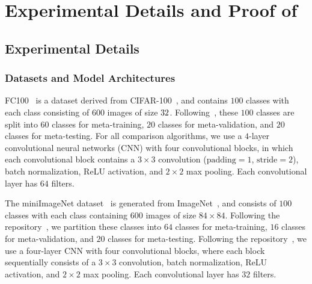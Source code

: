 \documentclass{osudissert96}
\begin{document}
\appendix

\chapter{Experimental Details and Proof of }\label{sec: append_deter_bilevel}

\section{Experimental Details}\label{appen:meta_learning}
\subsection*{Datasets and Model Architectures}
FC100~\cite{oreshkin2018tadam} is a dataset derived from CIFAR-100~\cite{krizhevsky2009learning}, and contains $100$ classes with each class consisting of $600$ images of size $32\time 32$. Following~\cite{oreshkin2018tadam}, these $100$ classes are split  into $60$ classes for meta-training, $20$ classes for meta-validation, and $20$ classes for meta-testing.   For all comparison algorithms, we use a $4$-layer convolutional neural networks (CNN) with four convolutional blocks, in which each convolutional block contains a $3\times 3$ convolution ($\text{padding}=1$, $\text{stride}=2$), batch normalization, ReLU activation, and $2\times 2$
max pooling. Each convolutional layer has $64$ filters. 


The miniImageNet dataset~\cite{vinyals2016matching} is generated from ImageNet~\cite{russakovsky2015imagenet}, and consists of $100$ classes with each class containing $600$ images of size $84\times 84$. Following the repository~\cite{learn2learn2019}, we partition these classes into $64$ classes for meta-training, $16$ classes for meta-validation, and $20$ classes for meta-testing.
Following the repository~\cite{learn2learn2019}, we use a four-layer CNN with four convolutional blocks, where each block sequentially consists of  a $3\times 3$ convolution, batch normalization, ReLU activation, and $2\times 2$
max pooling. Each convolutional layer has $32$ filters. 
\end{document}
